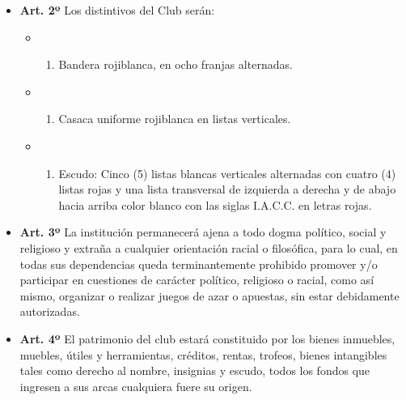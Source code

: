 \documentclass[openany]{book}
\providecommand{\tightlist}{%
  \setlength{\itemsep}{0pt}\setlength{\parskip}{0pt}}
\begin{document}
\begin{itemize}
\tightlist
\item
  \textbf{Art. 2º}
  Los distintivos del Club serán:

  \begin{itemize}
  \item
    \begin{enumerate}
    \def\labelenumi{\alph{enumi})}
    \tightlist
    \item
      Bandera rojiblanca, en ocho franjas alternadas.
    \end{enumerate}
  \item
    \begin{enumerate}
    \def\labelenumi{\alph{enumi})}
    \setcounter{enumi}{1}
    \tightlist
    \item
      Casaca uniforme rojiblanca en listas verticales.
    \end{enumerate}
  \item
    \begin{enumerate}
    \def\labelenumi{\alph{enumi})}
    \setcounter{enumi}{2}
    \tightlist
    \item
      Escudo: Cinco (5) listas blancas verticales alternadas con cuatro (4) listas rojas y una lista transversal de izquierda a derecha y de abajo hacia arriba color blanco con las siglas I.A.C.C. en letras rojas.
    \end{enumerate}
  \end{itemize}
\end{itemize}

\begin{itemize}
\tightlist
\item
  \textbf{Art. 3º}
  La institución permanecerá ajena a todo dogma político, social y religioso y extraña a cualquier orientación racial o filosófica, para lo cual, en todas sus dependencias queda terminantemente prohibido promover y/o participar en cuestiones de carácter político, religioso o racial, como así mismo, organizar o realizar juegos de azar o apuestas, sin estar debidamente autorizadas.
\end{itemize}

\begin{itemize}
\tightlist
\item
  \textbf{Art. 4º}
  El patrimonio del club estará constituido por los bienes inmuebles, muebles, útiles y herramientas, créditos, rentas, trofeos, bienes intangibles tales como derecho al nombre, insignias y escudo, todos los fondos que ingresen a sus arcas cualquiera fuere su origen.
\end{itemize}
\end{document}
